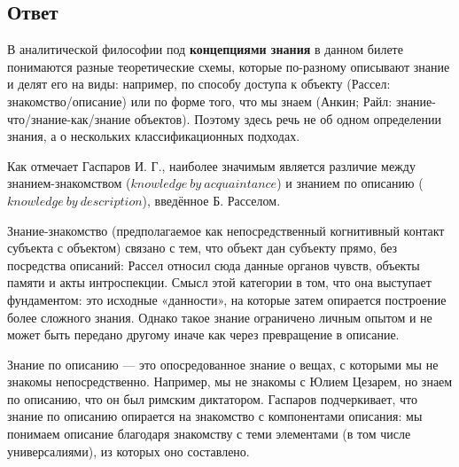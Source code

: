 \documentclass[a4paper,12pt]{article}
\begin{document}
\subsection{Ответ}

В аналитической философии под \textbf{концепциями знания} в данном билете понимаются разные теоретические схемы, которые по-разному описывают знание и делят его на виды: например, по способу доступа к объекту (Рассел: знакомство/описание) или по форме того, что мы знаем (Анкин; Райл: знание-что/знание-как/знание объектов). Поэтому здесь речь не об одном определении знания, а о нескольких классификационных подходах.

Как отмечает Гаспаров И. Г., наиболее значимым является различие между знанием-знакомством ($knowledge\ by\ acquaintance$) и знанием по описанию ($knowledge\ by\ description$), введённое Б. Расселом.

Знание-знакомство (предполагаемое как непосредственный когнитивный контакт субъекта с объектом) связано с тем, что объект дан субъекту прямо, без посредства описаний: Рассел относил сюда данные органов чувств, объекты памяти и акты интроспекции. Смысл этой категории в том, что она выступает фундаментом: это исходные «данности», на которые затем опирается построение более сложного знания. Однако такое знание ограничено личным опытом и не может быть передано другому иначе как через превращение в описание.

Знание по описанию --- это опосредованное знание о вещах, с которыми мы не знакомы непосредственно. Например, мы не знакомы с Юлием Цезарем, но знаем по описанию, что он был римским диктатором. Гаспаров подчеркивает, что знание по описанию опирается на знакомство с компонентами описания: мы понимаем описание благодаря знакомству с теми элементами (в том числе универсалиями), из которых оно составлено.
\end{document}
